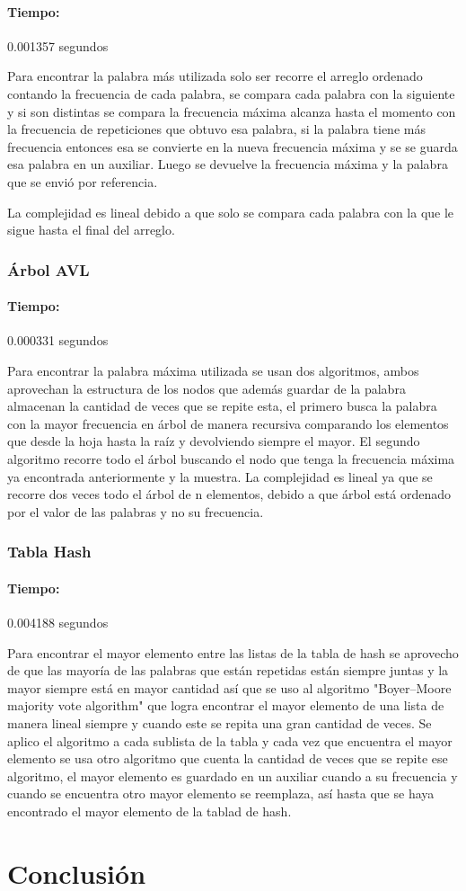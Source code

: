 \documentclass[12pt,letterpaper]{scrartcl}
\begin{document}
\paragraph{Tiempo:} 0.001357 segundos

Para encontrar la palabra más utilizada solo ser recorre el arreglo ordenado contando la frecuencia de cada palabra, se compara cada palabra con la siguiente y si son distintas se compara la frecuencia máxima alcanza hasta el momento con la frecuencia de repeticiones que obtuvo esa palabra, si la palabra tiene más frecuencia entonces esa se convierte en la nueva frecuencia máxima y se se guarda esa palabra en un auxiliar. Luego se devuelve la frecuencia máxima y la palabra que se envió por referencia.

La complejidad es lineal debido a que solo se compara cada palabra con la que le sigue hasta el final del arreglo.

\subsubsection{Árbol AVL}

\paragraph{Tiempo:} 0.000331 segundos

Para encontrar la palabra máxima utilizada se usan dos algoritmos, ambos aprovechan la estructura de los nodos que además guardar de la palabra almacenan la cantidad de veces que se repite esta, el primero busca la palabra con la  mayor frecuencia en árbol de manera recursiva comparando los elementos que desde la hoja hasta la raíz y devolviendo siempre el mayor. El segundo algoritmo recorre todo el árbol buscando el nodo que tenga la frecuencia máxima ya encontrada anteriormente y la muestra. La complejidad es lineal ya que se recorre dos veces todo el árbol de n elementos, debido a que árbol está ordenado por el valor de las palabras y no su frecuencia.

\subsubsection{Tabla Hash}

\paragraph{Tiempo:} 0.004188 segundos

Para encontrar el mayor elemento entre las listas de la tabla de hash se aprovecho de que las mayoría de las palabras que están repetidas están siempre juntas y la mayor siempre está en mayor cantidad así que se uso al algoritmo "Boyer–Moore majority vote algorithm" que logra encontrar el mayor elemento de una lista de manera lineal siempre y cuando este se repita una gran cantidad de veces. Se aplico el algoritmo a cada sublista de la tabla y cada vez que encuentra el mayor elemento se usa otro algoritmo que cuenta la cantidad de veces que se repite ese algoritmo, el mayor elemento es guardado en un auxiliar cuando a su frecuencia y cuando se encuentra otro mayor elemento se reemplaza, así hasta que se haya encontrado el mayor elemento de la tablad de hash.

\section{Conclusión}
\end{document}
